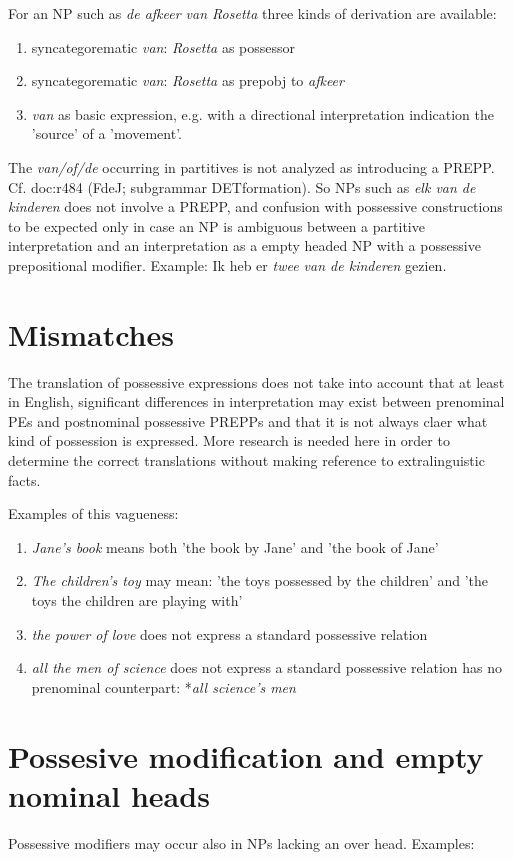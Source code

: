 \noindent
For an NP such as {\em de afkeer van Rosetta}
three kinds of derivation are available:

\begin{enumerate}
  \item syncategorematic {\em van}: {\em Rosetta} as possessor
  \item syncategorematic {\em van}: {\em Rosetta} as prepobj to {\em afkeer}
  \item {\em van} as basic expression, e.g. with a directional interpretation 
indication the 'source' of a 'movement'.
\end{enumerate}


\noindent
The {\em van/of/de} occurring in partitives is not analyzed as introducing a 
PREPP. Cf. doc:r484 (FdeJ; subgrammar DETformation). 
So NPs such as {\em elk van de kinderen} does not involve a PREPP, and 
confusion with possessive constructions to be expected only in case an NP is 
ambiguous between a partitive interpretation and an interpretation as
a empty headed NP with a possessive 
prepositional modifier. Example: Ik heb er {\em twee van de kinderen} gezien. 


\section{Mismatches}
The translation of possessive expressions does not take into account that 
at least in English, significant differences in interpretation may 
exist between
prenominal PEs and postnominal possessive PREPPs
and that it is not always claer what kind of possession is expressed.
More research is needed here in order to determine
the correct translations without making reference to extralinguistic facts.


Examples of this vagueness:
\begin{enumerate}
  \item 
{\em Jane's book} means both 'the book by Jane' and 
'the book of Jane'
  \item
{\em The children's toy} may mean: 'the toys possessed by the children' and 
'the toys the children are playing with'
  \item
{\em the power of love} does not express a  standard possessive relation
  \item
{\em all the men of science}  does not express a  standard possessive relation
 has no prenominal counterpart: *{\em all science's men}
\end{enumerate}


\section{Possesive modification and empty nominal heads}
\label{enh}
Possessive modifiers may occur also in NPs lacking an over head. 
Examples:\\


